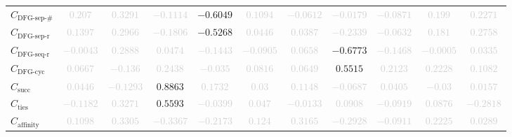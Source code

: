 \documentclass{standalone}
\newcommand{\dfgsepnumname}{\text{DFG-sep-\#}}
\newcommand{\dfgsepnum}{C_{\dfgsepnumname}}
\newcommand{\dfgseprationame}{\text{DFG-sep-r}}
\newcommand{\dfgsepratio}{C_{\dfgseprationame}}
\newcommand{\dfgseqrationame}{\text{DFG-seq-r}}
\newcommand{\dfgseqratio}{C_{\dfgseqrationame}}
\newcommand{\dfgcycname}{\text{DFG-cyc}}
\newcommand{\dfgcyc}{C_{\dfgcycname}}
\newcommand{\numberofneighborhoodsname}{\text{succ}}
\newcommand{\numberofneighborhoods}{C_{\numberofneighborhoodsname}}
\newcommand{\numberoftiesname}{\text{ties}}
\newcommand{\numberofties}{C_{\numberoftiesname}}
\newcommand{\affinityname}{\text{affinity}}
\newcommand{\affinity}{C_{\affinityname}}
\begin{document}
\begin{tabular}{lcccccccccc}
$\dfgsepnum$ & \textcolor{lightgray}{$0.207$} & \textcolor{lightgray}{$0.3291$} & \textcolor{lightgray}{$-0.1114$} & $-0.6049$ & \textcolor{lightgray}{$0.1094$} & \textcolor{lightgray}{$-0.0612$} & \textcolor{lightgray}{$-0.0179$} & \textcolor{lightgray}{$-0.0871$} & \textcolor{lightgray}{$0.199$} & \textcolor{lightgray}{$0.2271$} \\ 
$\dfgsepratio$ & \textcolor{lightgray}{$0.1397$} & \textcolor{lightgray}{$0.2966$} & \textcolor{lightgray}{$-0.1806$} & $-0.5268$ & \textcolor{lightgray}{$0.0446$} & \textcolor{lightgray}{$0.0387$} & \textcolor{lightgray}{$-0.2339$} & \textcolor{lightgray}{$-0.0632$} & \textcolor{lightgray}{$0.181$} & \textcolor{lightgray}{$0.2758$} \\ 
$\dfgseqratio$ & \textcolor{lightgray}{$-0.0043$} & \textcolor{lightgray}{$0.2888$} & \textcolor{lightgray}{$0.0474$} & \textcolor{lightgray}{$-0.1443$} & \textcolor{lightgray}{$-0.0905$} & \textcolor{lightgray}{$0.0658$} & $-0.6773$ & \textcolor{lightgray}{$-0.1468$} & \textcolor{lightgray}{$-0.0005$} & \textcolor{lightgray}{$0.0335$} \\ 
$\dfgcyc$ & \textcolor{lightgray}{$0.0667$} & \textcolor{lightgray}{$-0.136$} & \textcolor{lightgray}{$0.2438$} & \textcolor{lightgray}{$-0.035$} & \textcolor{lightgray}{$0.0816$} & \textcolor{lightgray}{$0.0649$} & $0.5515$ & \textcolor{lightgray}{$0.2123$} & \textcolor{lightgray}{$0.2228$} & \textcolor{lightgray}{$0.1082$} \\ 
$\numberofneighborhoods$ & \textcolor{lightgray}{$0.0446$} & \textcolor{lightgray}{$-0.1293$} & $0.8863$ & \textcolor{lightgray}{$0.1732$} & \textcolor{lightgray}{$0.03$} & \textcolor{lightgray}{$0.1148$} & \textcolor{lightgray}{$-0.0687$} & \textcolor{lightgray}{$0.0405$} & \textcolor{lightgray}{$-0.03$} & \textcolor{lightgray}{$0.0157$} \\ 
$\numberofties$ & \textcolor{lightgray}{$-0.1182$} & \textcolor{lightgray}{$0.3271$} & $0.5593$ & \textcolor{lightgray}{$-0.0399$} & \textcolor{lightgray}{$0.047$} & \textcolor{lightgray}{$-0.0133$} & \textcolor{lightgray}{$0.0908$} & \textcolor{lightgray}{$-0.0919$} & \textcolor{lightgray}{$0.0876$} & \textcolor{lightgray}{$-0.2818$} \\ 
$\affinity$ & \textcolor{lightgray}{$0.1098$} & \textcolor{lightgray}{$0.3305$} & \textcolor{lightgray}{$-0.3367$} & \textcolor{lightgray}{$-0.2173$} & \textcolor{lightgray}{$0.124$} & \textcolor{lightgray}{$0.3165$} & \textcolor{lightgray}{$-0.2928$} & \textcolor{lightgray}{$-0.0911$} & \textcolor{lightgray}{$0.2225$} & \textcolor{lightgray}{$0.0289$} \\ 

\end{tabular}
\end{document}
